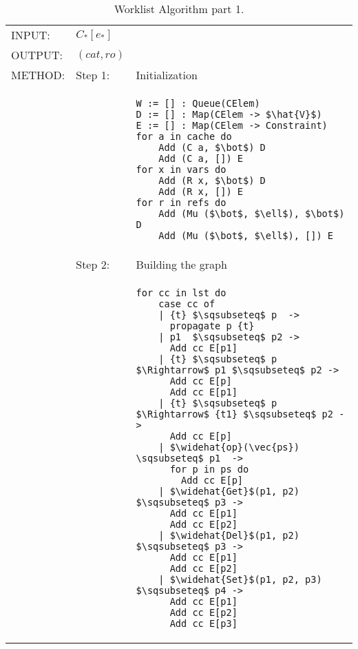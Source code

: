 \begin{table}[htb]
\small
\begin{center}
\begin{tabular}{l l l}
INPUT: & $C_*[e_*]$\\
OUTPUT: & $(cat, ro)$\\
METHOD: &
Step 1:& Initialization\\
&&
\begin{lstlisting}[mathescape]
W := [] : Queue(CElem)
D := [] : Map(CElem -> $\hat{V}$)
E := [] : Map(CElem -> Constraint)
for a in cache do 
    Add (C a, $\bot$) D
    Add (C a, []) E
for x in vars do 
    Add (R x, $\bot$) D
    Add (R x, []) E
for r in refs do 
    Add (Mu ($\bot$, $\ell$), $\bot$) D
    Add (Mu ($\bot$, $\ell$), []) E
\end{lstlisting}\\
&Step 2: & Building the graph\\
&&
\begin{lstlisting}[mathescape]
for cc in lst do
    case cc of
    | {t} $\sqsubseteq$ p  -> 
      propagate p {t}
    | p1  $\sqsubseteq$ p2 -> 
      Add cc E[p1]
    | {t} $\sqsubseteq$ p $\Rightarrow$ p1 $\sqsubseteq$ p2 -> 
      Add cc E[p]
      Add cc E[p1]
    | {t} $\sqsubseteq$ p $\Rightarrow$ {t1} $\sqsubseteq$ p2 -> 
      Add cc E[p]
    | $\widehat{op}(\vec{ps}) \sqsubseteq$ p1  -> 
      for p in ps do
        Add cc E[p]
    | $\widehat{Get}$(p1, p2) $\sqsubseteq$ p3 -> 
      Add cc E[p1]
      Add cc E[p2]
    | $\widehat{Del}$(p1, p2) $\sqsubseteq$ p3 -> 
      Add cc E[p1]
      Add cc E[p2]
    | $\widehat{Set}$(p1, p2, p3) $\sqsubseteq$ p4 -> 
      Add cc E[p1]
      Add cc E[p2]
      Add cc E[p3]
\end{lstlisting}\\
\end{tabular}
\end{center}
\caption{Worklist Algorithm part 1.}
\label{tab:Worklist1}
\end{table}
